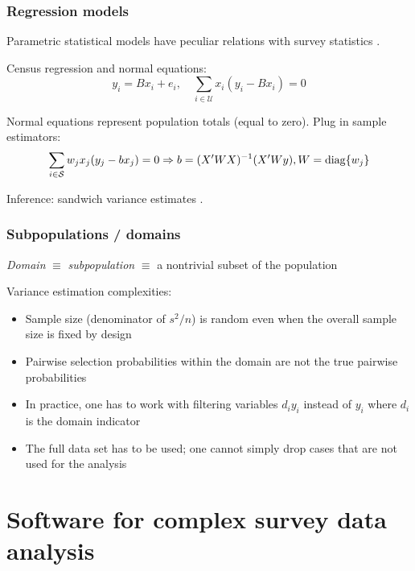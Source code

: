 \documentclass{beamer}
\begin{document}
\begin{frame}\frametitle{Regression models}

Parametric statistical models have peculiar relations with survey statistics
\citep{skinner:1989,binder:roberts:2003,binder:roberts:2009}.

Census regression and normal equations:
$$
y_i = B x_i + e_i, \quad \sum_{i\in\mathcal{U}} x_i (y_i - B x_i) = 0
$$

Normal equations represent population totals (equal to zero). Plug in sample estimators:
$$
\sum_{i\in\mathcal{S}} w_j x_j (y_j - b x_j) = 0 \Rightarrow b = (X'WX)^{-1} (X'Wy), W = {\rm diag}\{ w_j \}
$$

Inference: sandwich variance estimates \citep{fuller:1975,binder:1983,fuller:2002}.

\end{frame}

\begin{frame}\frametitle{Subpopulations / domains}

\textit{Domain} $\equiv$ \textit{subpopulation} $\equiv$ a nontrivial subset of the population

\bigskip

Variance estimation complexities:
\begin{itemize}
    \item Sample size (denominator of $s^2/n$) is random even when the overall sample size is fixed by design
    \item Pairwise selection probabilities within the domain are not the true pairwise probabilities
    \item In practice, one has to work with filtering variables $d_i y_i$ instead of $y_i$ where
        $d_i$ is the domain indicator
    \item The full data set has to be used; one cannot simply drop cases that are not used for the analysis
\end{itemize}

\citet{west:berglund:heeringa:2008}

\end{frame}


\section{Software for complex survey data analysis}
\end{document}
